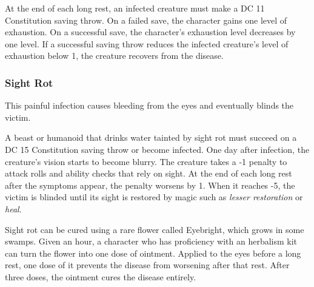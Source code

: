 \documentclass[
]{article}
\begin{document}
At the end of each long rest, an infected creature must make a DC 11
Constitution saving throw. On a failed save, the character gains one
level of exhaustion. On a successful save, the character's exhaustion
level decreases by one level. If a successful saving throw reduces the
infected creature's level of exhaustion below 1, the creature recovers
from the disease.

\hypertarget{sight-rot}{%
\subsubsection{Sight Rot}\label{sight-rot}}

This painful infection causes bleeding from the eyes and eventually
blinds the victim.

A beast or humanoid that drinks water tainted by sight rot must succeed
on a DC 15 Constitution saving throw or become infected. One day after
infection, the creature's vision starts to become blurry. The creature
takes a -1 penalty to attack rolls and ability checks that rely on
sight. At the end of each long rest after the symptoms appear, the
penalty worsens by 1. When it reaches -5, the victim is blinded until
its sight is restored by magic such as \emph{lesser restoration} or
\emph{heal}.

Sight rot can be cured using a rare flower called Eyebright, which grows
in some swamps. Given an hour, a character who has proficiency with an
herbalism kit can turn the flower into one dose of ointment. Applied to
the eyes before a long rest, one dose of it prevents the disease from
worsening after that rest. After three doses, the ointment cures the
disease entirely.
\end{document}
